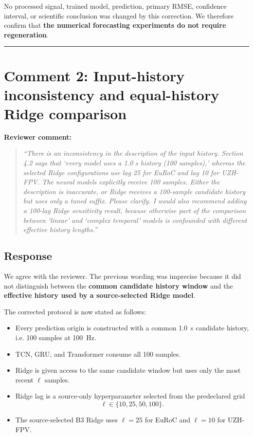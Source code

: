 \documentclass[12pt,a4paper]{article}
\begin{document}
No processed signal, trained model, prediction, primary RMSE, confidence interval, or scientific conclusion was changed by this correction. We therefore confirm that \textbf{the numerical forecasting experiments do not require regeneration}.

\bigskip
\hrule
\bigskip

\section*{Comment 2: Input-history inconsistency and equal-history Ridge comparison}

\noindent
\textbf{Reviewer comment:}

\begin{quote}
\itshape
``There is an inconsistency in the description of the input history. Section 4.2 says that `every model uses a 1.0 s history (100 samples),' whereas the selected Ridge configurations use lag 25 for EuRoC and lag 10 for UZH-FPV. The neural models explicitly receive 100 samples. Either the description is inaccurate, or Ridge receives a 100-sample candidate history but uses only a tuned suffix. Please clarify. I would also recommend adding a 100-lag Ridge sensitivity result, because otherwise part of the comparison between `linear' and `complex temporal' models is confounded with different effective history lengths.''
\end{quote}

\subsection*{Response}

We agree with the reviewer. The previous wording was imprecise because it did not distinguish between the \textbf{common candidate history window} and the \textbf{effective history used by a source-selected Ridge model}.

The corrected protocol is now stated as follows:

\begin{itemize}[leftmargin=*]
    \item Every prediction origin is constructed with a common \SI{1.0}{\second} candidate history, i.e. 100 samples at \SI{100}{\hertz}.
    \item TCN, GRU, and Transformer consume all 100 samples.
    \item Ridge is given access to the same candidate window but uses only the most recent $\ell$ samples.
    \item Ridge lag is a source-only hyperparameter selected from the predeclared grid
    \[
        \ell\in\{10,25,50,100\}.
    \]
    \item The source-selected B3 Ridge uses $\ell=25$ for EuRoC and $\ell=10$ for UZH-FPV.
\end{itemize}
\end{document}
